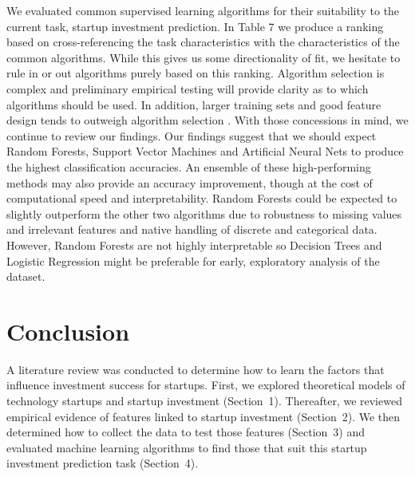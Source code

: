 \documentclass[../thesis/thesis.tex]{subfiles}
\begin{document}
We evaluated common supervised learning algorithms for their suitability to the current task, startup investment prediction. In Table 7 we produce a ranking based on cross-referencing the task characteristics with the characteristics of the common algorithms. While this gives us some directionality of fit, we hesitate to rule in or out algorithms purely based on this ranking. Algorithm selection is complex and preliminary empirical testing will provide clarity as to which algorithms should be used. In addition, larger training sets and good feature design tends to outweigh algorithm selection \cite{caruana2008}. With those concessions in mind, we continue to review our findings. Our findings suggest that we should expect Random Forests, Support Vector Machines and Artificial Neural Nets to produce the highest classification accuracies. An ensemble of these high-performing methods may also provide an accuracy improvement, though at the cost of computational speed and interpretability. Random Forests could be expected to slightly outperform the other two algorithms due to robustness to missing values and irrelevant features and native handling of discrete and categorical data. However, Random Forests are not highly interpretable so Decision Trees and Logistic Regression might be preferable for early, exploratory analysis of the dataset.


\label{fig:litreview:algorithms:evaluation}

\section{Conclusion}
\label{sec:litreview:conclusion}


A literature review was conducted to determine how to learn the factors that influence investment success for startups. First, we explored theoretical models of technology startups and startup investment (Section~1). Thereafter, we reviewed empirical evidence of features linked to startup investment (Section~2). We then determined how to collect the data to test those features (Section~3) and evaluated machine learning algorithms to find those that suit this startup investment prediction task (Section~4).

\end{document}

